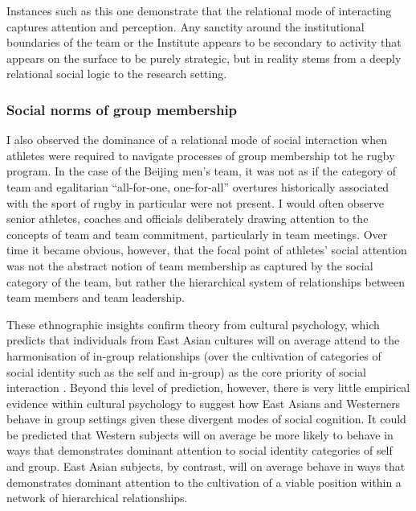 \begin{CJK}{UTF8}{gbsn}
Instances such as this one demonstrate that the relational mode of interacting captures attention and perception. Any sanctity around the institutional boundaries of the team or the Institute appears to be secondary to activity that appears on the surface to be purely strategic, but in reality stems from a deeply relational social logic to the research setting.



      \subsubsection{Social norms of group membership}

I also observed the dominance of a relational mode of social interaction when athletes were required to navigate processes of group membership tot he rugby program.  In the case of the Beijing men's team, it was not as if the category of team and egalitarian ``all-for-one, one-for-all'' overtures historically associated with the sport of rugby in particular were not present.  I would often observe senior athletes, coaches and officials deliberately drawing attention to the concepts of team and team commitment, particularly in team meetings.  Over time it became obvious, however, that the focal point of athletes' social attention was not the abstract notion of team membership as captured by the social category of the team, but rather the hierarchical system of relationships between team members and team leadership.

These ethnographic insights confirm theory from cultural psychology, which predicts that individuals from East Asian cultures will on average attend to the harmonisation of in-group relationships (over the cultivation of categories of social identity such as the self and in-group) as the core priority of social interaction \citep{Yuki2003,Nisbett2003}.  Beyond this level of prediction, however, there is very little empirical evidence within cultural psychology to suggest how East Asians and Westerners behave in group settings given these divergent modes of social cognition.  It could be predicted that Western subjects will on average be more likely to behave in ways that demonstrates dominant attention to social identity categories of self and group.  East Asian subjects, by contrast, will on average behave in ways that demonstrates dominant attention to the cultivation of a viable position within a network of hierarchical relationships.


\end{CJK}
